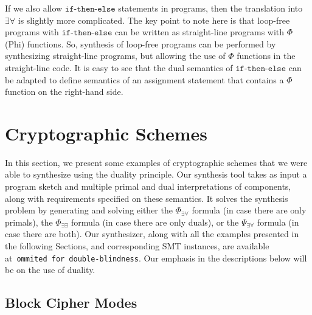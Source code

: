 \documentclass[preprint]{sig-alternate-05-2015}
\def\ite{{\texttt{if-then-else}}}
\begin{document}
{If we also allow $\ite$ statements in programs, then the
translation into $\exists\forall$ is slightly more
complicated.   The key point to note here is that
loop-free programs with $\ite$ can be written
as straight-line programs with $\Phi$ (Phi) functions.
So, synthesis of loop-free programs can be performed
by synthesizing straight-line programs, but allowing the
use of $\Phi$ functions in the straight-line code.
It is easy to see that the dual semantics of $\ite$
can be adapted to define semantics of an assignment
statement that contains a $\Phi$ function on the right-hand
side.



\endignore}


\section{Cryptographic Schemes}
\label{sec:application}

In this section, we present some examples of cryptographic schemes that we
were able to synthesize using the duality principle.
Our synthesis tool takes as input a program sketch and multiple primal 
and dual interpretations of components, along with requirements
specified on these semantics. It solves the synthesis problem by
generating and solving either 
the $\Phi_{\exists\forall}$ formula (in case there are only primals),
the $\Phi_{\exists\exists}$ formula (in case there are only duals), or the 
$\Psi_{\exists\forall}$ formula (in case there are both).
Our synthesizer, along with all the examples 
presented in the following Sections,
and corresponding 
SMT instances, are available at~\texttt{ommited for double-blindness}.
Our emphasis in the descriptions below will be on the use of duality.

\subsection{Block Cipher Modes}
\end{document}
